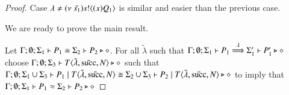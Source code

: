 \begin{proof}
	Case $\lambda \not= (\nu\ \tilde{s_1}) s ! \langle (x)Q_1 \rangle$ is similar and easier than the previous case.

	We are ready to prove the main result.

	Let $\Gamma; \emptyset; \Sigma_1 \vdash P_1 \cong \Sigma_2 \vdash P_2 \triangleright \diamond$.
	For all $\tilde{\lambda}$ such that $\Gamma; \emptyset; \Sigma_1 \vdash P_1 \stackrel{\lambda}{\Longrightarrow} \Sigma_1' \vdash P_1' \triangleright \diamond$
	choose $\Gamma; \emptyset; \Sigma_3 \vdash T\langle \tilde{\lambda}, \tilde{\textrm{succ}}, N \rangle \triangleright \diamond$ such that
	$\Gamma; \emptyset; \Sigma_1 \cup \Sigma_3 \vdash P_1 \;|\; T\langle \tilde{\lambda}, \tilde{\textrm{succ}}, N \rangle \cong \Sigma_2 \cup \Sigma_3 \vdash P_2 \;|\; T\langle \tilde{\lambda}, \tilde{\textrm{succ}}, N \rangle \triangleright \diamond$
	to imply that $\Gamma; \emptyset; \Sigma_1 \vdash P_1 \approx \Sigma_2 \vdash P_2 \triangleright \diamond$

\end{proof}






